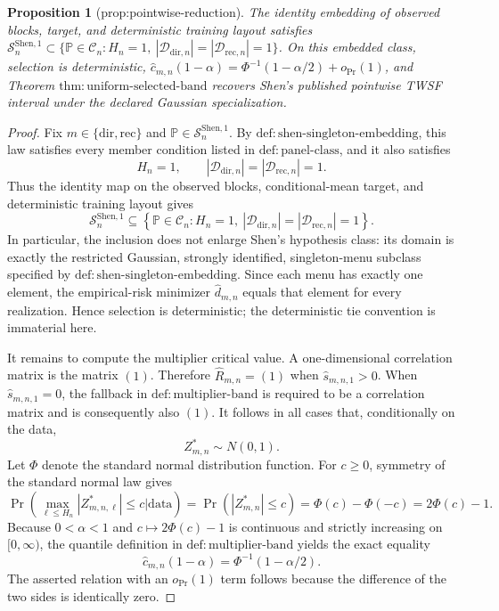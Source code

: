 \documentclass{article}
\newtheorem{proposition}{Proposition}
\begin{document}
\begin{proposition}[prop:pointwise-reduction]\label{prop:pointwise-reduction}
The identity embedding of observed blocks, target, and deterministic training layout satisfies \(\mathcal S_n^{\mathrm{Shen},1}\subset\{\mathbb P\in\mathcal C_n:H_n=1,\ |\mathcal D_{\mathrm{dir},n}|=|\mathcal D_{\mathrm{rec},n}|=1\}\). On this embedded class, selection is deterministic, \(\widehat c_{m,n}(1-\alpha)=\Phi^{-1}(1-\alpha/2)+o_{\Pr}(1)\), and Theorem \(\mathrm{thm{:}uniform\mbox{-}selected\mbox{-}band}\) recovers Shen's published pointwise TWSF interval under the declared Gaussian specialization.
\end{proposition}
\begin{proof}
Fix \(m\in\{\mathrm{dir},\mathrm{rec}\}\) and \(\mathbb P\in\mathcal S_n^{\mathrm{Shen},1}\).  By \(\mathrm{def{:}shen\mbox{-}singleton\mbox{-}embedding}\), this law satisfies every member condition listed in \(\mathrm{def{:}panel\mbox{-}class}\), and it also satisfies
\[
 H_n=1,
 \qquad
 |\mathcal D_{\mathrm{dir},n}|=|\mathcal D_{\mathrm{rec},n}|=1.
\]
Thus the identity map on the observed blocks, conditional-mean target, and deterministic training layout gives
\[
 \mathcal S_n^{\mathrm{Shen},1}
 \subseteq
 \left\{\mathbb P\in\mathcal C_n:
 H_n=1,\ |
 \mathcal D_{\mathrm{dir},n}|=|
 \mathcal D_{\mathrm{rec},n}|=1\right\}.
\]
In particular, the inclusion does not enlarge Shen's hypothesis class: its domain is exactly the restricted Gaussian, strongly identified, singleton-menu subclass specified by \(\mathrm{def{:}shen\mbox{-}singleton\mbox{-}embedding}\).  Since each menu has exactly one element, the empirical-risk minimizer \(\widehat d_{m,n}\) equals that element for every realization.  Hence selection is deterministic; the deterministic tie convention is immaterial here.

It remains to compute the multiplier critical value.  A one-dimensional correlation matrix is the matrix \((1)\).  Therefore \(\widehat R_{m,n}=(1)\) when \(\widehat s_{m,n,1}>0\).  When \(\widehat s_{m,n,1}=0\), the fallback in \(\mathrm{def{:}multiplier\mbox{-}band}\) is required to be a correlation matrix and is consequently also \((1)\).  It follows in all cases that, conditionally on the data,
\[
 Z_{m,n}^{\ast}\sim N(0,1).
\]
Let \(\Phi\) denote the standard normal distribution function.  For \(c\geq0\), symmetry of the standard normal law gives
\[
 \Pr\!\left(
 \max_{\ell\leq H_n}|Z_{m,n,\ell}^{\ast}|\leq c
 \mathrel{\big|}\mathrm{data}
 \right)
 =\Pr(|Z_{m,n}^{\ast}|\leq c)
 =\Phi(c)-\Phi(-c)
 =2\Phi(c)-1.
\]
Because \(0<\alpha<1\) and \(c\mapsto2\Phi(c)-1\) is continuous and strictly increasing on \([0,\infty)\), the quantile definition in \(\mathrm{def{:}multiplier\mbox{-}band}\) yields the exact equality
\[
 \widehat c_{m,n}(1-\alpha)
 =\Phi^{-1}(1-\alpha/2).
\]
The asserted relation with an \(o_{\Pr}(1)\) term follows because the difference of the two sides is identically zero.


\end{proof}
\end{document}
